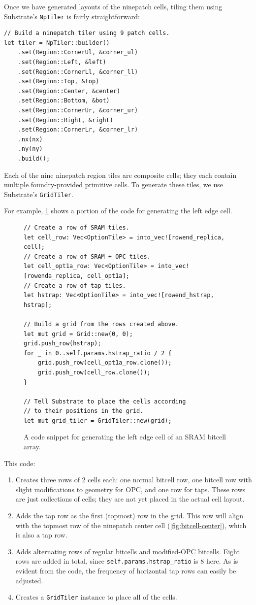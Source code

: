 Once we have generated layouts of the ninepatch cells, tiling them 
using Substrate's \verb|NpTiler| is fairly straightforward:

\begin{verbatim}
// Build a ninepatch tiler using 9 patch cells.
let tiler = NpTiler::builder()
    .set(Region::CornerUl, &corner_ul)
    .set(Region::Left, &left)
    .set(Region::CornerLl, &corner_ll)
    .set(Region::Top, &top)
    .set(Region::Center, &center)
    .set(Region::Bottom, &bot)
    .set(Region::CornerUr, &corner_ur)
    .set(Region::Right, &right)
    .set(Region::CornerLr, &corner_lr)
    .nx(nx)
    .ny(ny)
    .build();
\end{verbatim}

Each of the nine ninepatch region tiles are composite cells; they each contain
multiple foundry-provided primitive cells. To generate these tiles, we use Substrate's \verb|GridTiler|.

For example, \ref{fig:bitcell-left-cell-code} shows a portion of the code for generating the left edge cell.
\begin{figure}[H] \centering
\begin{verbatim} 
// Create a row of SRAM tiles.
let cell_row: Vec<OptionTile> = into_vec![rowend_replica, cell];
// Create a row of SRAM + OPC tiles.
let cell_opt1a_row: Vec<OptionTile> = into_vec![rowenda_replica, cell_opt1a];
// Create a row of tap tiles.
let hstrap: Vec<OptionTile> = into_vec![rowend_hstrap, hstrap];

// Build a grid from the rows created above.
let mut grid = Grid::new(0, 0);
grid.push_row(hstrap);
for _ in 0..self.params.hstrap_ratio / 2 {
    grid.push_row(cell_opt1a_row.clone());
    grid.push_row(cell_row.clone());
}

// Tell Substrate to place the cells according
// to their positions in the grid.
let mut grid_tiler = GridTiler::new(grid);
\end{verbatim}
\caption{A code snippet for generating the left edge cell of an SRAM bitcell array. \label{fig:bitcell-left-cell-code}}
\end{figure}

This code:
\begin{enumerate}
\item Creates three rows of 2 cells each: one normal bitcell row, one bitcell row with slight modifications
  to geometry for OPC, and one row for taps. These rows are just collections of cells; they are not
  yet placed in the actual cell layout.
\item Adds the tap row as the first (topmost) row in the grid. This row will align with the topmost row
  of the ninepatch center cell (\ref{fig:bitcell-center}), which is also a tap row.
\item Adds alternating rows of regular bitcells and modified-OPC bitcells. Eight rows are added in total,
  since \verb|self.params.hstrap_ratio| is 8 here. As is evident from the code, the frequency of horizontal
  tap rows can easily be adjusted.
\item Creates a \verb|GridTiler| instance to place all of the cells.
\end{enumerate}

